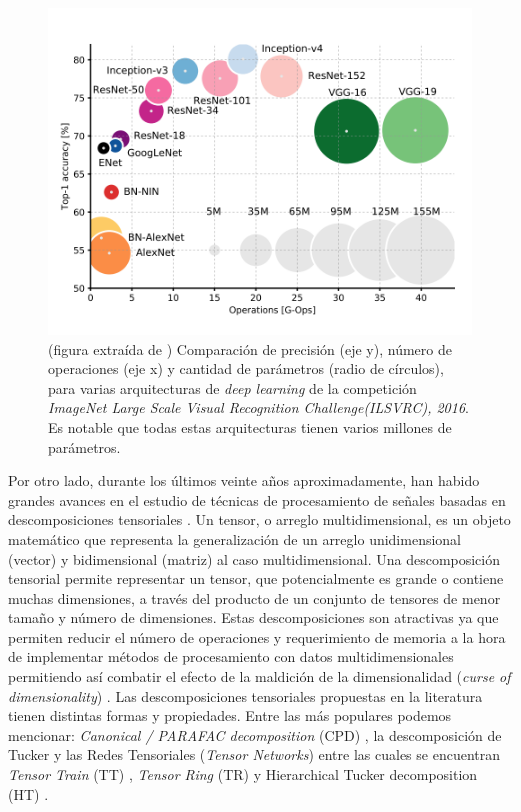 \documentclass[spanish]{article}
\theoremstyle{definition}
\theoremstyle{remark}
\numberwithin{equation}{section}
\numberwithin{equation}{section} %
\begin{document}
\begin{figure}[H]
 \centering
 \includegraphics[width=12cm]{img/operation-vs-acc.png}
\caption[Precisión, operaciones y cantidad de parámetros de diferentes redes ]{\footnotesize{ (figura extraída de \cite{canziani2016analysis}) Comparación de precisión (eje y), número de operaciones (eje x) y cantidad de parámetros (radio de círculos), para varias arquitecturas de \textit{deep learning} de la competición \textit{ImageNet Large Scale Visual Recognition Challenge(ILSVRC), 2016}. Es notable que todas estas arquitecturas tienen varios millones de parámetros.}} 
\label{fig:acc}
\end{figure}
Por otro lado, durante los últimos veinte años aproximadamente, han habido grandes avances en el estudio de técnicas de procesamiento de señales basadas en descomposiciones tensoriales \cite{cichocki2015tensor,sidiropoulos2017tensor}. Un tensor, o arreglo multidimensional, es un objeto matemático que representa la generalización de un arreglo unidimensional (vector) y bidimensional (matriz) al caso multidimensional. Una descomposición tensorial permite representar un tensor, que potencialmente es grande o contiene muchas dimensiones, a través del producto de un conjunto de tensores de menor tamaño y número de dimensiones. Estas descomposiciones son atractivas ya que permiten reducir el número de operaciones y requerimiento de memoria a la hora de implementar métodos de procesamiento con datos multidimensionales permitiendo así combatir el efecto de la maldición de la dimensionalidad (\textit{curse of dimensionality}) \cite{bellman2015adaptive}. Las descomposiciones tensoriales propuestas en la literatura tienen distintas formas y propiedades. Entre las más populares podemos mencionar: \textit{Canonical / PARAFAC decomposition} (CPD) \cite{carroll1970analysis,harshman1970foundations,kiers2000towards}, la descomposición de Tucker \cite{tucker1963implications} y las Redes Tensoriales (\textit{Tensor Networks}) entre las cuales se encuentran \textit{Tensor Train} (TT) \cite{oseledets2011tensor}, \textit{Tensor Ring} (TR) \cite{zhao2016tensor} y Hierarchical Tucker decomposition (HT)  \cite{hackbusch2009new}.\par
\end{document}
